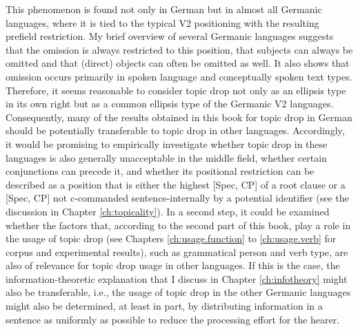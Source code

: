 This phenomenon is found not only in German but in almost all Germanic languages, where it is tied to the typical V2 positioning  with the resulting prefield restriction. 
My brief overview of several Germanic languages suggests that the omission is always restricted to this position, that subjects can always be omitted and that (direct) objects can often be omitted as well. It also shows that omission occurs primarily in spoken language and conceptually spoken text types. 
Therefore, it seems reasonable to consider topic drop not only as an ellipsis type in its own right but as a common ellipsis type of the Germanic V2 languages. 
Consequently, many of the results obtained in this book for topic drop in German should be potentially transferable to topic drop in other languages.
Accordingly, it would be promising to empirically investigate whether topic drop in these languages is also generally unacceptable in the middle field,  whether certain conjunctions can precede it, and whether its positional restriction can be described as a position that is either the highest [Spec, CP] of a root clause or a [Spec, CP] not c-commanded  sentence-internally by a potential identifier (see the discussion in Chapter \ref{ch:topicality}).
In a second step, it could be examined whether the factors that, according to the second part of this book, play a role in the usage of topic drop (see Chapters \ref{ch:usage.function} to \ref{ch:usage.verb} for corpus and experimental results), such as grammatical person and verb type, are also of relevance for topic drop usage in other languages.
If this is the case, the information-theoretic explanation that I discuss in Chapter \ref{ch:infotheory} might also be transferable, i.e., the usage of topic drop in the other Germanic languages might also be determined, at least in part, by distributing information in a sentence as uniformly as possible to reduce the processing effort for the hearer.

